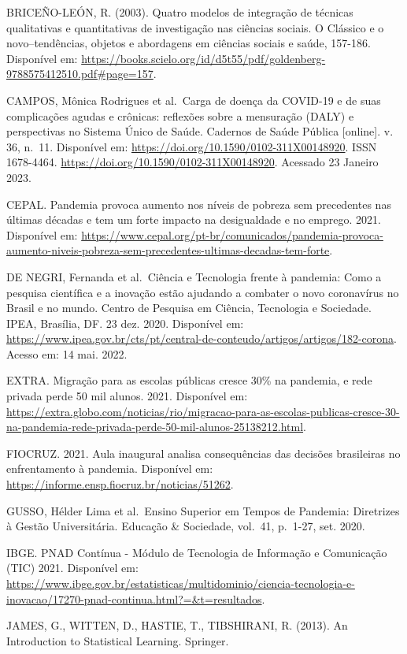 \documentclass[
]{article}
\begin{document}
BRICEÑO-LEÓN, R. (2003). Quatro modelos de integração de técnicas
qualitativas e quantitativas de investigação nas ciências sociais. O
Clássico e o novo--tendências, objetos e abordagens em ciências sociais
e saúde, 157-186. Disponível em:
\url{https://books.scielo.org/id/d5t55/pdf/goldenberg-9788575412510.pdf\#page=157}.

CAMPOS, Mônica Rodrigues et al.~Carga de doença da COVID-19 e de suas
complicações agudas e crônicas: reflexões sobre a mensuração (DALY) e
perspectivas no Sistema Único de Saúde. Cadernos de Saúde Pública
{[}online{]}. v. 36, n.~11. Disponível em:
\url{https://doi.org/10.1590/0102-311X00148920}. ISSN 1678-4464.
\url{https://doi.org/10.1590/0102-311X00148920}. Acessado 23 Janeiro
2023.

CEPAL. Pandemia provoca aumento nos níveis de pobreza sem precedentes
nas últimas décadas e tem um forte impacto na desigualdade e no emprego.
2021. Disponível em:
\url{https://www.cepal.org/pt-br/comunicados/pandemia-provoca-aumento-niveis-pobreza-sem-precedentes-ultimas-decadas-tem-forte}.

DE NEGRI, Fernanda et al.~Ciência e Tecnologia frente à pandemia: Como a
pesquisa científica e a inovação estão ajudando a combater o novo
coronavírus no Brasil e no mundo. Centro de Pesquisa em Ciência,
Tecnologia e Sociedade. IPEA, Brasília, DF. 23 dez. 2020. Disponível em:
\url{https://www.ipea.gov.br/cts/pt/central-de-conteudo/artigos/artigos/182-corona}.
Acesso em: 14 mai. 2022.

EXTRA. Migração para as escolas públicas cresce 30\% na pandemia, e rede
privada perde 50 mil alunos. 2021. Disponível em:
\url{https://extra.globo.com/noticias/rio/migracao-para-as-escolas-publicas-cresce-30-na-pandemia-rede-privada-perde-50-mil-alunos-25138212.html}.

FIOCRUZ. 2021. Aula inaugural analisa consequências das decisões
brasileiras no enfrentamento à pandemia. Disponível em:
\url{https://informe.ensp.fiocruz.br/noticias/51262}.

GUSSO, Hélder Lima et al.~Ensino Superior em Tempos de Pandemia:
Diretrizes à Gestão Universitária. Educação \& Sociedade, vol.~41,
p.~1-27, set. 2020.

IBGE. PNAD Contínua - Módulo de Tecnologia de Informação e Comunicação
(TIC) 2021. Disponível em:
\url{https://www.ibge.gov.br/estatisticas/multidominio/ciencia-tecnologia-e-inovacao/17270-pnad-continua.html?=\&t=resultados}.

JAMES, G., WITTEN, D., HASTIE, T., TIBSHIRANI, R. (2013). An
Introduction to Statistical Learning. Springer.
\end{document}
